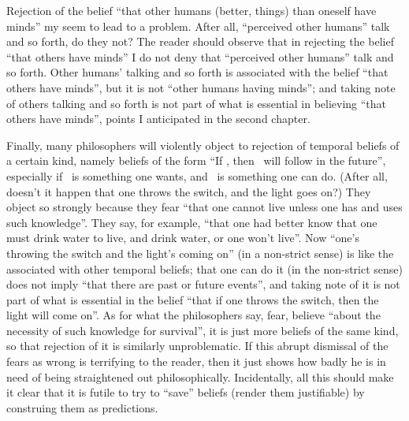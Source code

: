 Rejection of the belief \enquote{that other humans (better, things) than oneself have minds} my seem to lead to a problem. After all, \enquote{perceived other humans} talk and so forth, do they not? The reader should observe that in rejecting the belief \enquote{that others have minds} I do not deny that \enquote{perceived other humans} talk and so forth. Other humans' talking and so forth is associated with the belief \enquote{that others have minds}, but it is not \enquote{other humans having minds}; and taking note of others talking and so forth is not part of what is essential in believing \enquote{that others have minds}, points I anticipated in the second chapter. 

Finally, many philosophers will violently object to rejection of temporal beliefs of a certain kind, namely beliefs of the form \enquote{If \x, then \y\ will follow in the future}, especially if \y\ is something one wants, and \x\ is something one can do. (After all, doesn't it happen that one throws the switch, and the light goes on?) They object so strongly because they fear \enquote{that one cannot live unless one has and uses such knowledge}. They say, for example, \enquote{that one had better know that one must drink water to live, and drink water, or one won't live}. Now \enquote{one's throwing the switch and the light's coming on} (in a non-strict sense) is like the  associated with other temporal beliefs; that one can do it (in the non-strict sense) does not imply \enquote{that there are past or future events}, and taking note of it is not part of what is essential in the belief \enquote{that if one throws the switch, then the light will come on}. As for what the philosophers say, fear, believe \enquote{about the necessity of such knowledge for survival}, it is just more beliefs of the same kind, so that rejection of it is similarly unproblematic. If this abrupt dismissal of the fears as wrong is terrifying to the reader, then it just shows how badly he is in need of being straightened out philosophically. Incidentally, all this should make it clear that it is futile to try to \enquote{save} beliefs (render them justifiable) by construing them as predictions. 

